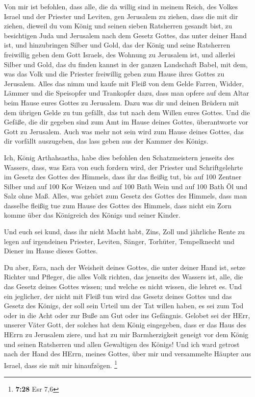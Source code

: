  Von mir ist befohlen, dass alle, die da willig sind in
meinem Reich, des Volkes Israel und der Priester und Leviten, gen
Jerusalem zu ziehen, dass die mit dir ziehen,  dieweil du
vom König und seinen sieben Ratsherren gesandt bist, zu besichtigen Juda
und Jerusalem nach dem Gesetz Gottes, das unter deiner Hand ist,
 und hinzubringen Silber und Gold, das der König und seine
Ratsherren freiwillig geben dem Gott Israels, des Wohnung zu Jerusalem
ist,  und allerlei Silber und Gold, das du finden kannst in
der ganzen Landschaft Babel, mit dem, was das Volk und die Priester
freiwillig geben zum Hause ihres Gottes zu Jerusalem. 
Alles das nimm und kaufe mit Fleiß von dem Gelde Farren, Widder, Lämmer
und die Speisopfer und Trankopfer dazu, dass man opfere auf dem Altar
beim Hause eures Gottes zu Jerusalem.  Dazu was dir und
deinen Brüdern mit dem übrigen Gelde zu tun gefällt, das tut nach dem
Willen eures Gottes.  Und die Gefäße, die dir gegeben sind
zum Amt im Hause deines Gottes, überantworte vor Gott zu Jerusalem.
 Auch was mehr not sein wird zum Hause deines Gottes, das
dir vorfällt auszugeben, das lass geben aus der Kammer des Königs.

 Ich, König Arthahsastha, habe dies befohlen den
Schatzmeistern jenseits des Wassers, dass, was Esra von euch fordern
wird, der Priester und Schriftgelehrte im Gesetz des Gottes des Himmels,
dass ihr das fleißig tut,  bis auf 100 Zentner Silber und
auf 100 Kor Weizen und auf 100 Bath Wein und auf 100 Bath Öl und Salz
ohne Maß.  Alles, was gehört zum Gesetz des Gottes des
Himmels, dass man dasselbe fleißig tue zum Hause des Gottes des Himmels,
dass nicht ein Zorn komme über das Königreich des Königs und seiner
Kinder.

 Und euch sei kund, dass ihr nicht Macht habt, Zins, Zoll
und jährliche Rente zu legen auf irgendeinen Priester, Leviten, Sänger,
Torhüter, Tempelknecht und Diener im Hause dieses Gottes.

 Du aber, Esra, nach der Weisheit deines Gottes, die unter
deiner Hand ist, setze Richter und Pfleger, die alles Volk richten, das
jenseits des Wassers ist, alle, die das Gesetz deines Gottes wissen; und
welche es nicht wissen, die lehret es.  Und ein jeglicher,
der nicht mit Fleiß tun wird das Gesetz deines Gottes und das Gesetz des
Königs, der soll sein Urteil um der Tat willen haben, es sei zum Tod
oder in die Acht oder zur Buße am Gut oder ins Gefängnis. 
Gelobet sei der HErr, unserer Väter Gott, der solches hat dem König
eingegeben, dass er das Haus des HErrn zu Jerusalem ziere, 
und hat zu mir Barmherzigkeit geneigt vor dem König und seinen
Ratsherren und allen Gewaltigen des Königs! Und ich ward getrost nach
der Hand des HErrn, meines Gottes, über mir und versammelte Häupter aus
Israel, dass sie mit mir hinaufzögen. \footnote{\textbf{7:28} Esr 7,6}

